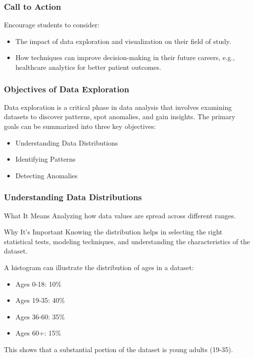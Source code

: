 \documentclass[aspectratio=169]{beamer}
\begin{document}
\begin{frame}[fragile]
    \frametitle{Call to Action}
    
    Encourage students to consider:
    \begin{itemize}
        \item The impact of data exploration and visualization on their field of study.
        \item How techniques can improve decision-making in their future careers, e.g., healthcare analytics for better patient outcomes.
    \end{itemize}
\end{frame}

\begin{frame}[fragile]
    \frametitle{Objectives of Data Exploration}

    Data exploration is a critical phase in data analysis that involves examining datasets to discover patterns, spot anomalies, and gain insights. The primary goals can be summarized into three key objectives:

    \begin{itemize}
        \item Understanding Data Distributions
        \item Identifying Patterns
        \item Detecting Anomalies
    \end{itemize}
\end{frame}

\begin{frame}[fragile]
    \frametitle{Understanding Data Distributions}

    \begin{block}{What It Means}
        Analyzing how data values are spread across different ranges.
    \end{block}

    \begin{block}{Why It's Important}
        Knowing the distribution helps in selecting the right statistical tests, modeling techniques, and understanding the characteristics of the dataset.
    \end{block}

    \begin{example}
        A histogram can illustrate the distribution of ages in a dataset:
        \begin{itemize}
            \item Ages 0-18: 10\%
            \item Ages 19-35: 40\%
            \item Ages 36-60: 35\%
            \item Ages 60+: 15\%
        \end{itemize}
        This shows that a substantial portion of the dataset is young adults (19-35).
    \end{example}
\end{frame}
\end{document}
